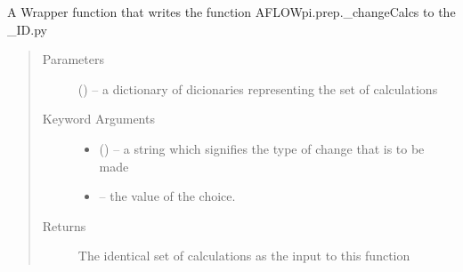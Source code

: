 \documentclass[letterpaper,10pt,english]{sphinxmanual}
\begin{document}
\begin{fulllineitems}

\begin{fulllineitems}
\label{\detokenize{prep:prep.calcs_container.tight_binding}}
\end{fulllineitems}


\begin{fulllineitems}
\label{\detokenize{prep:prep.calcs_container.values}}
\end{fulllineitems}


\begin{fulllineitems}
\label{\detokenize{prep:prep.calcs_container.vcrelax}}
\end{fulllineitems}


\end{fulllineitems}


\begin{fulllineitems}
\label{\detokenize{prep:prep.changeCalcs}}
A Wrapper function that writes the function AFLOWpi.prep.\_changeCalcs to the \_ID.py
\begin{quote}\begin{description}
\item[{Parameters}] \leavevmode
{} () -- a dictionary of dicionaries representing the set of calculations

\item[{Keyword Arguments}] \leavevmode\begin{itemize}
\item {} 
 () -- a string which signifies the type of change that is to be made

\item {} 
 -- the value of the choice.

\end{itemize}

\item[{Returns}] \leavevmode
The identical set of calculations as the input to this function

\end{description}\end{quote}

\end{fulllineitems}
\end{document}
